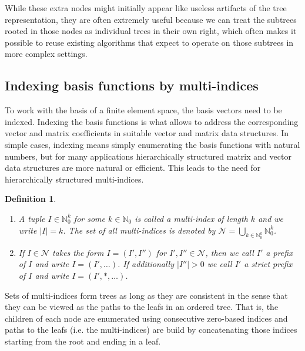 \documentclass[a4paper,10pt,headings=normal,bibliography=totoc]{scrartcl}
\newtheorem{definition}{Definition}
\newcommand{\N}{\mathbb{N}}
\begin{document}
While these extra nodes might initially appear like useless artifacts of the tree representation, they are often extremely useful
because we can treat the subtrees rooted in those nodes as individual trees in their own right, which often makes it possible to
reuse existing algorithms that expect to operate on those subtrees in more complex settings.




\subsection{Indexing basis functions by multi-indices}
\label{sec:basis_ordering}

To work with the basis of a finite element space, the basis vectors need to be indexed.  Indexing the basis functions
is what allows to address the corresponding vector and matrix coefficients in suitable vector and matrix data structures.
In simple cases, indexing means simply enumerating the basis functions with natural numbers, but for many applications
hierarchically structured matrix and vector data structures are more natural or efficient.  This leads to the need
for hierarchically structured multi-indices.

\begin{definition}
    \begin{enumerate}
        \item
            A tuple $I \in \N_0^k$ for some $k \in \N_0$ is called a multi-index of length $k$
            and we write $|I|=k$.
            The set of all multi-indices is denoted by
            $\mathcal{N} = \bigcup_{k \in \N_0^k} \N_0^k$.
        \item
            If $I \in \mathcal{N}$ takes the form $I = (I',I'')$ for $I',I'' \in \mathcal{N}$,
            then we call $I'$ a prefix of $I$ and write $I = (I',\dots)$.
            If additionally $|I''|>0$ we call $I'$ a strict prefix of $I$ and write $I = (I',*,\dots)$.
    \end{enumerate}
\end{definition}

Sets of multi-indices form trees as long as they are consistent in the sense that they
can be viewed as the paths to the leafs in an ordered tree.
That is, the children of each node are enumerated using consecutive zero-based
indices and paths to the leafs (i.e. the multi-indices) are build by concatenating
those indices starting from the root and ending in a leaf.
\end{document}
